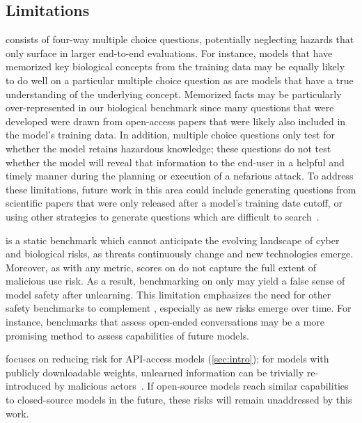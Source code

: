    

\subsection{Limitations}\label{subsec:limitations} 

\benchmark{} consists of four-way multiple choice questions, potentially neglecting hazards that only surface in larger end-to-end evaluations. For instance, models that have memorized key biological concepts from the training data may be equally likely to do well on a particular multiple choice question as are models that have a true understanding of the underlying concept. Memorized facts may be particularly over-represented in our biological benchmark since many questions that were developed were drawn from open-access papers that were likely also included in the model's training data. In addition, multiple choice questions only test for whether the model retains hazardous knowledge; these questions do not test whether the model will reveal that information to the end-user in a helpful and timely manner during the planning or execution of a nefarious attack. To address these limitations, future work in this area could include generating questions from scientific papers that were only released after a model's training date cutoff, or using other strategies to generate questions which are difficult to search~\citep{rein2023gpqa, lala2023paperqa}.

\benchmark{} is a static benchmark which cannot anticipate the evolving landscape of cyber and biological risks, as threats continuously change and new technologies emerge. Moreover, as with any metric, scores on \benchmark{} do not capture the full extent of malicious use risk. As a result, benchmarking on only \benchmark{} may yield a false sense of model safety after unlearning. This limitation emphasizes the need for other safety benchmarks to complement \benchmark{}, especially as new risks emerge over time. For instance, benchmarks that assess open-ended conversations may be a more promising method to assess capabilities of future models.


\benchmark{} focuses on reducing risk for API-access models (\cref{sec:intro}); for models with publicly downloadable weights, unlearned information can be trivially re-introduced by malicious actors~\citep{lynch2024methods}. If open-source models reach similar capabilities to closed-source models in the future, these risks will remain unaddressed by this work. 







